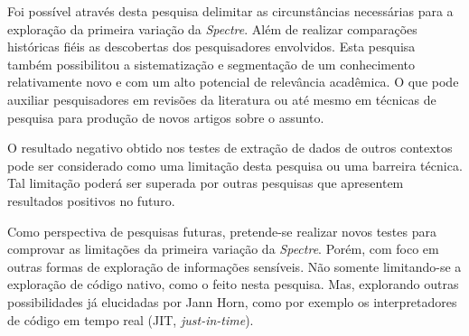 \documentclass[
	article,			    %
	12pt,				    %
	oneside,			    %
	a4paper,			    %
	chapter=TITLE,		    %
	section=TITLE,		    %
	subsection=TITLE,	    %
	english,			    %
	brazil,				    %
	sumario=tradicional
]{abntex2}
\begin{document}
Foi possível através desta pesquisa delimitar as circunstâncias necessárias para a exploração da primeira variação da \emph{Spectre}. Além de realizar comparações históricas fiéis as descobertas dos pesquisadores envolvidos. Esta pesquisa também possibilitou a sistematização e segmentação de um conhecimento relativamente novo e com um alto potencial de relevância acadêmica. O que pode auxiliar pesquisadores em revisões da literatura ou até mesmo em técnicas de pesquisa para produção de novos artigos sobre o assunto.

O resultado negativo obtido nos testes de extração de dados de outros contextos pode ser considerado
como uma limitação desta pesquisa ou uma barreira técnica. Tal limitação poderá ser superada por
outras pesquisas que apresentem resultados positivos no futuro.

Como perspectiva de pesquisas futuras, pretende-se realizar novos testes para comprovar as limitações da primeira variação da \emph{Spectre}. Porém, com foco em outras formas de exploração de informações sensíveis. Não somente limitando-se a exploração de código nativo, como o feito nesta pesquisa. Mas, explorando outras possibilidades já elucidadas por Jann Horn, como por exemplo os interpretadores de código em tempo real (JIT, \emph{just-in-time}).

\postextual

\begin{apendicesenv}
\end{apendicesenv}
\begin{anexosenv}
\vspace{\onelineskip}
\end{anexosenv}
\end{document}
